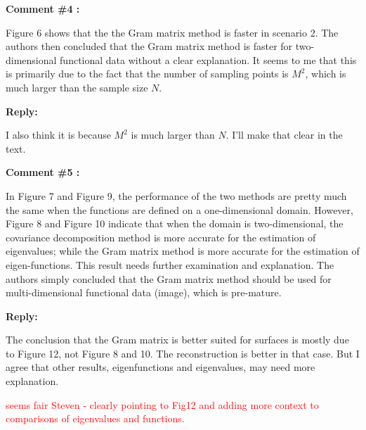 \documentclass[11pt]{article}
\begin{document}
\bigskip

\itshape


\textbf{Comment \#4 :}

Figure 6 shows that the the Gram matrix method is faster in scenario 2. The authors then concluded that the Gram matrix method is faster for two-dimensional functional data without a clear explanation. It seems to me that this is primarily due to the fact that the number of sampling points is $M^2$, which is much larger than the sample size $N$.

\medskip

\normalfont

\textbf{Reply:} 

I also think it is because $M^2$ is much larger than $N$. I'll make that clear in the text.

\bigskip

\itshape


\textbf{Comment \#5 :}

In Figure 7 and Figure 9, the performance of the two methods are pretty much the same when the functions are defined on a one-dimensional domain. However, Figure 8 and Figure 10 indicate that when the domain is two-dimensional, the covariance decomposition method is more accurate for the estimation of eigenvalues; while the Gram matrix method is more accurate for the estimation of eigen-functions. This result needs further examination and explanation. The authors simply concluded that the Gram matrix method should be used for multi-dimensional functional data (image), which is pre-mature.

\medskip

\normalfont

\textbf{Reply:} 

The conclusion that the Gram matrix is better suited for surfaces is mostly due to Figure 12, not Figure 8 and 10. The reconstruction is better in that case. 
But I agree that other results, eigenfunctions and eigenvalues, may need more explanation. 

\textcolor{red}{seems fair Steven - clearly pointing to Fig12 and adding more context to comparisons of eigenvalues and functions. }



 
\end{document}
